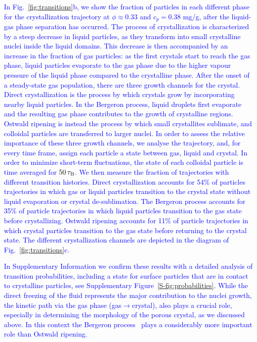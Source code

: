 \documentclass[preprint,amsmath,amssymb,superscriptaddress]{revtex4-1}
\begin{document}
\textcolor{blue}{
In Fig.~\ref{fig:transitions}b, we show  the fraction of particles in each different phase for the crystallization trajectory at
$\phi\approx 0.33$ and $c_p=0.38$ mg/g, after the liquid-gas phase separation has occurred.
The process of crystallization is characterized 
by a steep decrease in liquid particles, as they transform into small crystalline nuclei inside the liquid domains. This decrease
is then accompanied by an increase in the fraction of gas particles: as the first crystals start to reach the gas phase, liquid particles evaporate 
to the gas phase due to the higher vapour pressure of the liquid phase compared to the crystalline phase. After the onset 
of a steady-state gas population, there are three growth channels for the crystal. Direct crystallization is the process by which 
crystals grow by incorporating nearby liquid particles. In the Bergeron process, liquid droplets first evaporate and the resulting gas phase 
contributes to the growth of crystalline regions. Ostwald ripening is instead the process by which small crystallites sublimate, and colloidal
particles are transferred to larger nuclei. In order to assess the relative importance of these three growth channels, we analyse the trajectory, and, for every time frame, assign each particle a state between gas, liquid and crystal. In order to minimize short-term fluctuations, the state of each colloidal particle is time averaged for $50\,\tau_{\rm B}$. We then measure the fraction of trajectories with different transition histories.
Direct crystallization accounts for 54\% of particles trajectories in which
gas or liquid particles transition to the crystal state without liquid evaporation or crystal de-sublimation. The Bergeron process accounts for 35\% of particle trajectories in which liquid particles
transition to the gas state before crystallizing. Ostwald ripening accounts for 11\% of particle trajectories in which crystal particles transition to the gas state before returning
to the crystal state. The different crystallization channels are depicted in the diagram of Fig.~\ref{fig:transitions}c.}

\textcolor{blue}{
In Supplementary Information we confirm these results with a detailed analysis of transition probabilities, including a state for surface particles that are in contact 
to crystalline particles, see Supplementary Figure~\ref{S-fig:probabilities}.
While the direct freezing of the fluid represents the major contribution to the nuclei growth, the kinetic path via the gas phase (gas$\rightarrow$crystal), also plays a crucial role,
especially in determining the morphology of the porous crystal, as we discussed above. In this context the Bergeron process~\cite{glickman2000glossary,morrison2012resilience}
plays a considerably more important role than Ostwald ripening.}
\end{document}
